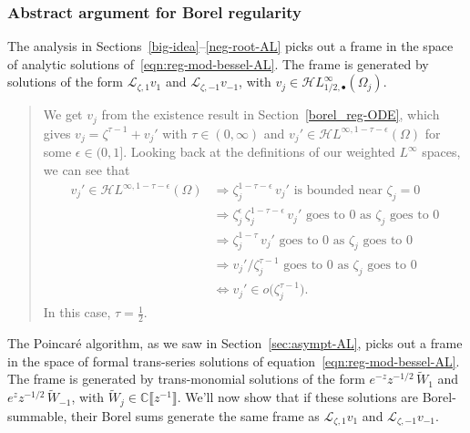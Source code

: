 \documentclass{article}
\newcommand{\singexp}[2]{\mathcal{H}L^\infty_{#1, #2}}
\newcommand{\singexpalg}[1]{\singexp{#1}{\bullet}}
\theoremstyle{definition}
\newcommand{\C}{\mathbb{C}}
\newcommand{\holoL}[1]{\mathcal{H}L^{#1}} %
\newcommand{\laplace}{\mathcal{L}}
\begin{document}
\subsubsection{Abstract argument for Borel regularity}\label{bessel-regularity-AL}
The analysis in Sections~\ref{big-idea}--\ref{neg-root-AL} picks out a frame in the space of analytic solutions of~\eqref{eqn:reg-mod-bessel-AL}. The frame is generated by solutions of the form $\laplace_{\zeta, 1} v_1$ and $\laplace_{\zeta, -1} v_{-1}$, with $v_j\in\singexpalg{1/2}(\Omega_j)$.
\color{DarkTurquoise}
\begin{quote}
We get $v_j$ from the existence result in Section~\ref{borel_reg-ODE}, which gives $v_j = \zeta^{\tau-1} + v_j'$ with $\tau \in (0, \infty)$ and $v_j' \in \holoL{\infty, 1-\tau-\epsilon}(\Omega)$ for some $\epsilon \in (0, 1]$. Looking back at the definitions of our weighted $L^\infty$ spaces, we can see that
\begin{align*}
v_j' \in \holoL{\infty, 1-\tau-\epsilon}(\Omega) & \Longrightarrow \zeta_j^{1-\tau-\epsilon}\,v_j' \text{ is bounded near } \zeta_j = 0 \\
& \Longrightarrow \zeta_j^\epsilon\,\zeta_j^{1-\tau-\epsilon}\,v_j' \text{ goes to } 0 \text{ as } \zeta_j \text{ goes to } 0 \\
& \Longrightarrow \zeta_j^{1-\tau}\,v_j' \text{ goes to } 0 \text{ as } \zeta_j \text{ goes to } 0 \\
& \Longrightarrow v_j' / \zeta_j^{\tau-1} \text{ goes to } 0 \text{ as } \zeta_j \text{ goes to } 0 \\
& \Longleftrightarrow v_j' \in o\big(\zeta_j^{\tau-1}\big).
\end{align*}
In this case, $\tau = \tfrac{1}{2}$.
\end{quote}
\color{black}

The Poincar\'{e} algorithm, as we saw in Section~\ref{sec:asympt-AL}, picks out a frame in the space of formal trans-series solutions of equation~\eqref{eqn:reg-mod-bessel-AL}. The frame is generated by trans-monomial solutions of the form $e^{-z} z^{-1/2}\,\tilde{W}_1$ and $e^z z^{-1/2}\,\tilde{W}_{-1}$, with $\tilde{W}_j \in \C\llbracket z^{-1} \rrbracket$. We'll now show that if these solutions are Borel-summable, their Borel sums generate the same frame as $\laplace_{\zeta, 1} v_1$ and $\laplace_{\zeta, -1} v_{-1}$.
\end{document}
